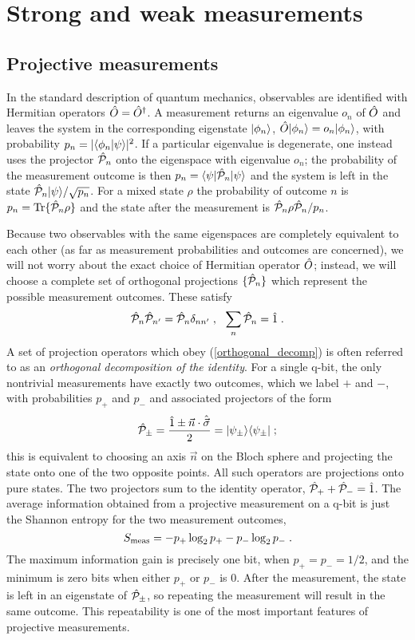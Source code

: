 \section{Strong and weak measurements}

\subsection{Projective measurements}

In the standard description of quantum mechanics, observables are identified
with Hermitian operators ${\hat O}={\hat O^\dagger}$.  A measurement returns an eigenvalue
$o_n$ of ${\hat O}$ and leaves the system in the corresponding eigenstate
${| \phi_n \rangle}$, ${\hat O}{| \phi_n \rangle}=o_n{| \phi_n \rangle}$, with probability
$p_n=|{\langle \phi_n | \psi \rangle}|^2$.  If a particular eigenvalue is degenerate,
one instead uses the projector $\P_n$ onto the eigenspace with eigenvalue
$o_n$; the probability of the measurement outcome is then
$p_n = \bra\psi\P_n\ket\psi$ and the system is left in the state
$\P_n\ket\psi/\sqrt{p_n}$.  For a mixed state $\rho$ the probability of
outcome $n$ is $p_n = \tr\{\P_n\rho\}$ and the state after the measurement
is $\P_n\rho\P_n/p_n$.

Because two observables with the same eigenspaces are completely equivalent
to each other (as far as measurement probabilities and outcomes
are concerned), we will not worry about the exact choice
of Hermitian operator ${\hat O}$; instead, we will
choose a complete set of orthogonal projections $\{\P_n\}$ which
represent the possible measurement outcomes.  These satisfy
\begin{equation}
\P_n \P_{n'} = \P_n \delta_{nn'} \;, \ \ \sum_n \P_n = \id \;.
\label{orthogonal_decomp}
\end{equation}
A set of projection operators which obey (\ref{orthogonal_decomp}) is
often referred to as an {\it orthogonal decomposition of the identity}.  For
a single q-bit, the only nontrivial measurements have exactly two outcomes,
which we label $+$ and $-$, with probabilities $p_+$ and $p_-$ and
associated projectors of the form
\begin{equation}
\P_\pm = { \id \pm \nvec\cdot\svec \over 2 }
  = \ket{\psi_\pm}\bra{\psi_\pm} \;;
\end{equation}
this is equivalent to choosing an axis $\vec n$
on the Bloch sphere and projecting
the state onto one of the two opposite points.
All such operators are projections onto pure states.
The two projectors sum to the identity operator, $\P_++\P_-=\id$.
The average information obtained from a projective measurement on a q-bit is
just the Shannon entropy for the two measurement outcomes,
\begin{equation}
S_{\rm meas} = - p_+ \log_2 p_+ - p_- \log_2 p_- \;.
\label{shannon}
\end{equation}
The maximum information gain is precisely one bit, when $p_+=p_-=1/2$,
and the minimum is zero bits when either $p_+$ or $p_-$ is 0.
After the measurement, the state is left in an eigenstate of $\P_\pm$, so
repeating the measurement will result in the same outcome.  This repeatability
is one of the most important features of projective measurements.

